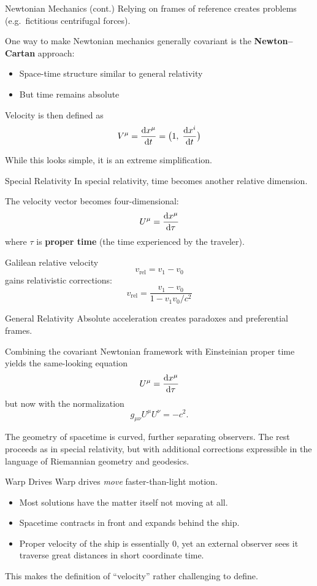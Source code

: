 \documentclass[aspectratio=169,11pt]{beamer}
\begin{document}
\begin{frame}{Newtonian Mechanics (cont.)}
Relying on frames of reference creates problems (e.g.\ fictitious centrifugal forces).

One way to make Newtonian mechanics generally covariant is the \textbf{Newton--Cartan} approach:
\begin{itemize}
  \item Space-time structure similar to general relativity
  \item But time remains absolute
\end{itemize}

Velocity is then defined as
\[
V^{\mu} = \dv{x^{\mu}}{t} = \bigl(1,\;\dv{x^{i}}{t}\bigr)
\]

While this looks simple, it is an extreme simplification.
\end{frame}

\begin{frame}{Special Relativity}
In special relativity, time becomes another relative dimension.

The velocity vector becomes four-dimensional:
\[
U^{\mu} = \dv{x^{\mu}}{\tau}
\]
where $\tau$ is \textbf{proper time} (the time experienced by the traveler).

Galilean relative velocity
\[
v_{\mathrm{rel}} = v_{1} - v_{0}
\]
gains relativistic corrections:
\[
v_{\mathrm{rel}} = \frac{v_{1}-v_{0}}{1-v_{1}v_{0}/c^{2}}
\]
\end{frame}

\begin{frame}{General Relativity}
Absolute acceleration creates paradoxes and preferential frames.

Combining the covariant Newtonian framework with Einsteinian proper time yields the same-looking equation
\[
U^{\mu} = \dv{x^{\mu}}{\tau}
\]
but now with the normalization
\[
g_{\mu\nu}U^{\mu}U^{\nu} = -c^{2}.
\]

The geometry of spacetime is curved, further separating observers. The rest proceeds as in special relativity, but with additional corrections expressible in the language of Riemannian geometry and geodesics.
\end{frame}

\begin{frame}{Warp Drives}
Warp drives \emph{move} faster-than-light motion.

\begin{itemize}
  \item Most solutions have the matter itself not moving at all.
  \item Spacetime contracts in front and expands behind the ship.
  \item Proper velocity of the ship is essentially $0$, yet an external observer sees it traverse great distances in short coordinate time.
\end{itemize}

This makes the definition of ``velocity'' rather challenging to define.
\end{frame}
\end{document}
